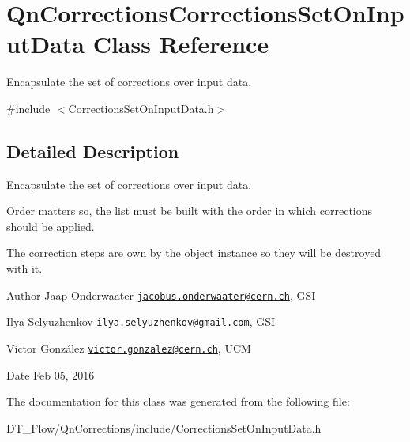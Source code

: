 \hypertarget{classQnCorrectionsCorrectionsSetOnInputData}{}\section{Qn\+Corrections\+Corrections\+Set\+On\+Input\+Data Class Reference}
\label{classQnCorrectionsCorrectionsSetOnInputData}


Encapsulate the set of corrections over input data.  




{\ttfamily \#include $<$Corrections\+Set\+On\+Input\+Data.\+h$>$}



\subsection{Detailed Description}
Encapsulate the set of corrections over input data. 

Order matters so, the list must be built with the order in which corrections should be applied.

The correction steps are own by the object instance so they will be destroyed with it.

\begin{DoxyAuthor}{Author}
Jaap Onderwaater \href{mailto:jacobus.onderwaater@cern.ch}{\tt jacobus.\+onderwaater@cern.\+ch}, G\+SI 

Ilya Selyuzhenkov \href{mailto:ilya.selyuzhenkov@gmail.com}{\tt ilya.\+selyuzhenkov@gmail.\+com}, G\+SI 

Víctor González \href{mailto:victor.gonzalez@cern.ch}{\tt victor.\+gonzalez@cern.\+ch}, U\+CM 
\end{DoxyAuthor}
\begin{DoxyDate}{Date}
Feb 05, 2016 
\end{DoxyDate}


The documentation for this class was generated from the following file\+:\begin{DoxyCompactItemize}
\item 
D\+T\+\_\+\+Flow/\+Qn\+Corrections/include/Corrections\+Set\+On\+Input\+Data.\+h\end{DoxyCompactItemize}
